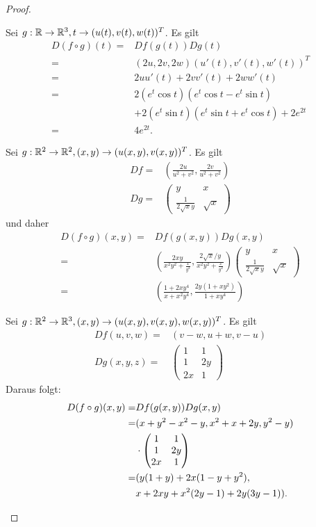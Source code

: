 \begin{proof}
	\begin{parts}
	\item Sei $g:\mathbb{R}\to \mathbb{R}^3,t\to (u(t), v(t), w(t))^T$. Es gilt
\begin{align*}
	D(f\circ g)(t)=&Df(g(t))Dg(t)\\
	=&(2u, 2v, 2w)(u'(t), v'(t), w'(t))^T\\
	=&2uu'(t)+2vv'(t)+2ww'(t)\\
	=&2(e^t\cos t)(e^t\cos t-e^t\sin t)\\
	 &+2(e^t\sin t)(e^t\sin t+e^t\cos t)+2e^{2t}\\
	=&4e^{2t}.
\end{align*}
\item Sei $g:\mathbb{R}^2\to \mathbb{R}^2, (x,y)\to (u(x,y),v(x,y))^T$. Es gilt
	\begin{align*}
		Df=&\left( \frac{2u}{u^2+v^2}, \frac{2v}{u^2+v^2} \right)\\
		Dg=&\begin{pmatrix} y & x \\ \frac{1}{2\sqrt{x} y} & \sqrt{x}  \end{pmatrix} 
	\end{align*}
und daher
	\begin{align*}
		D(f\circ g)(x,y)=&Df(g(x,y))Dg(x,y)\\
		=&\left( \frac{2xy}{x^2y^2+\frac{x}{y^2}}, \frac{2\sqrt{x} /y}{x^2y^2+\frac{x}{y^2}} \right) \begin{pmatrix} y & x \\ \frac{1}{2\sqrt{x} y}& \sqrt{x}  \end{pmatrix} \\
		=&\left( \frac{1+2xy^4}{x+x^2y^4}, \frac{2y(1+xy^2)}{1+xy^4} \right) 
	\end{align*}
\item Sei $g:\mathbb{R}^2\to \mathbb{R}^3, (x,y)\to (u(x,y), v(x,y), w(x,y))^T$. Es gilt
	\begin{align*}
		Df(u,v,w)=&(v-w, u+w, v-u)\\
		Dg(x,y,z)=&\begin{pmatrix} 1 & 1\\ 1 & 2y\\2x & 1 \end{pmatrix} 
	\end{align*}
	Daraus folgt:
	\begin{align*}
		D(f\circ g)(x,y)=&Df(g(x,y))Dg(x,y)\\
		=&(x+y^2-x^2-y, x^2+x+2y, y^2-y)\\
		 &\cdot\begin{pmatrix} 1 & 1 \\ 1 & 2y \\ 2x & 1 \end{pmatrix}\\
		=&(y(1+y)+2x(1-y+y^2),\\
		 &x+2xy+x^2(2y-1)+2y(3y-1)).\qedhere
	\end{align*}
	\end{parts}
\end{proof}
